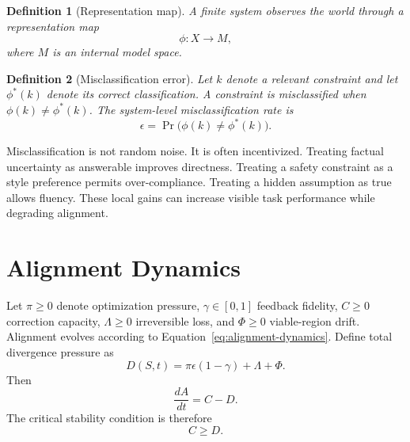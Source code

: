 \documentclass[11pt]{article}
\newtheorem{definition}{Definition}
\newcommand{\eps}{\epsilon}
\newcommand{\gam}{\gamma}
\begin{document}
\begin{definition}[Representation map]
A finite system observes the world through a representation map
\begin{equation}
\phi:X\rightarrow M,
\end{equation}
where $M$ is an internal model space.
\end{definition}

\begin{definition}[Misclassification error]
Let $k$ denote a relevant constraint and let $\phi^*(k)$ denote its correct classification. A constraint is misclassified when $\phi(k)\ne\phi^*(k)$. The system-level misclassification rate is
\begin{equation}
\eps=\Pr\big(\phi(k)\ne\phi^*(k)\big).
\end{equation}
\end{definition}

Misclassification is not random noise. It is often incentivized. Treating factual uncertainty as answerable improves directness. Treating a safety constraint as a style preference permits over-compliance. Treating a hidden assumption as true allows fluency. These local gains can increase visible task performance while degrading alignment.

\section{Alignment Dynamics}

Let $\pi\ge 0$ denote optimization pressure, $\gam\in[0,1]$ feedback fidelity, $C\ge 0$ correction capacity, $\Lambda\ge 0$ irreversible loss, and $\Phi\ge 0$ viable-region drift. Alignment evolves according to Equation~\ref{eq:alignment-dynamics}. Define total divergence pressure as
\begin{equation}
D(S,t)=\pi\eps(1-\gam)+\Lambda+\Phi.
\end{equation}
Then
\begin{equation}
\frac{dA}{dt}=C-D.
\end{equation}
The critical stability condition is therefore
\begin{equation}
C\ge D.
\label{eq:critical-boundary}
\end{equation}
\end{document}
